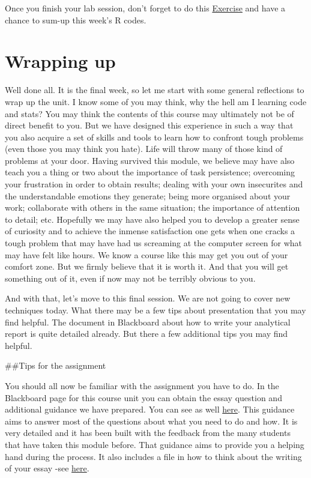 \documentclass[
]{book}
\begin{document}
Once you finish your lab session, don't forget to do this \href{https://eonk.shinyapps.io/MCD_ex}{Exercise} and have a chance to sum-up this week's R codes.

\chapter{Wrapping up}\label{wrapping-up}

Well done all.
It is the final week, so let me start with some general reflections to wrap up the unit. I know some of you may think, why the hell am I learning code and stats? You may think the contents of this course may ultimately not be of direct benefit to you. But we have designed this experience in such a way that you also acquire a set of skills and tools to learn how to confront tough problems (even those you may think you hate). Life will throw many of those kind of problems at your door. Having survived this module, we believe may have also teach you a thing or two about the importance of task persistence; overcoming your frustration in order to obtain results; dealing with your own insecurites and the understandable emotions they generate; being more organised about your work; collaborate with others in the same situation; the importance of attention to detail; etc. Hopefully we may have also helped you to develop a greater sense of curiosity and to achieve the inmense satisfaction one gets when one cracks a tough problem that may have had us screaming at the computer screen for what may have felt like hours. We know a course like this may get you out of your comfort zone. But we firmly believe that it is worth it. And that you will get something out of it, even if now may not be terribly obvious to you.

And with that, let's move to this final session. We are not going to cover new techniques today. What there may be a few tips about presentation that you may find helpful. The document in Blackboard about how to write your analytical report is quite detailed already. But there a few additional tips you may find helpful.

\#\#Tips for the assignment

You should all now be familiar with the assignment you have to do. In the Blackboard page for this course unit you can obtain the essay question and additional guidance we have prepared. You can see as well \href{https://github.com/eonk/mcd_book/blob/main/files_docs/STEPS\%20IN\%20THE\%20ANALYSIS\%20REQUIRED\%20FOR\%20THE\%20ESSAY.pdf}{here}. This guidance aims to answer most of the questions about what you need to do and how. It is very detailed and it has been built with the feedback from the many students that have taken this module before. That guidance aims to provide you a helping hand during the process. It also includes a file in how to think about the writing of your essay -see \href{https://github.com/eonk/mcd_book/blob/main/files_docs/WRITING\%20THE\%20ESSAY.pdf}{here}.
\end{document}
